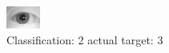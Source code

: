 \begin{figure}[h!]
\begin{center}
\includegraphics[width=0.60\columnwidth]{figures/ID1160_class_2_target_3.png}
\end{center}
\caption{ Classification: 2 actual target: 3}
\label{fig:ID1160_class_2_target_3}
\end{figure}
